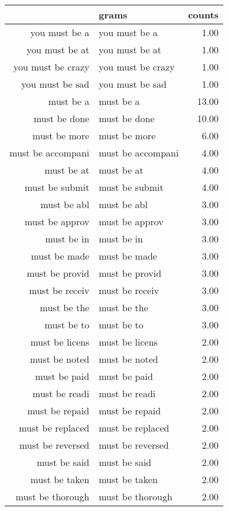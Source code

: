 \begin{table}[ht]
\centering
\begin{tabular}{rlr}
  \hline
 & grams & counts \\ 
  \hline
you must be a & you must be a & 1.00 \\ 
  you must be at & you must be at & 1.00 \\ 
  you must be crazy & you must be crazy & 1.00 \\ 
  you must be sad & you must be sad & 1.00 \\ 
  must be a & must be a & 13.00 \\ 
  must be done & must be done & 10.00 \\ 
  must be more & must be more & 6.00 \\ 
  must be accompani & must be accompani & 4.00 \\ 
  must be at & must be at & 4.00 \\ 
  must be submit & must be submit & 4.00 \\ 
  must be abl & must be abl & 3.00 \\ 
  must be approv & must be approv & 3.00 \\ 
  must be in & must be in & 3.00 \\ 
  must be made & must be made & 3.00 \\ 
  must be provid & must be provid & 3.00 \\ 
  must be receiv & must be receiv & 3.00 \\ 
  must be the & must be the & 3.00 \\ 
  must be to & must be to & 3.00 \\ 
  must be licens & must be licens & 2.00 \\ 
  must be noted & must be noted & 2.00 \\ 
  must be paid & must be paid & 2.00 \\ 
  must be readi & must be readi & 2.00 \\ 
  must be repaid & must be repaid & 2.00 \\ 
  must be replaced & must be replaced & 2.00 \\ 
  must be reversed & must be reversed & 2.00 \\ 
  must be said & must be said & 2.00 \\ 
  must be taken & must be taken & 2.00 \\ 
  must be thorough & must be thorough & 2.00 \\ 

\end{tabular}
\end{table}
